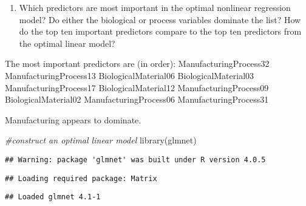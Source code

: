 \documentclass[
]{article}
\newenvironment{Shaded}{\begin{snugshade}}{\end{snugshade}}
\newcommand{\CommentTok}[1]{\textcolor[rgb]{0.56,0.35,0.01}{\textit{#1}}}
\newcommand{\FunctionTok}[1]{\textcolor[rgb]{0.00,0.00,0.00}{#1}}
\newcommand{\NormalTok}[1]{#1}
\newcommand{\OtherTok}[1]{\textcolor[rgb]{0.56,0.35,0.01}{#1}}
\newcommand{\SpecialCharTok}[1]{\textcolor[rgb]{0.00,0.00,0.00}{#1}}
\providecommand{\tightlist}{%
  \setlength{\itemsep}{0pt}\setlength{\parskip}{0pt}}
\begin{document}
\begin{enumerate}
\def\labelenumi{(\alph{enumi})}
\setcounter{enumi}{1}
\tightlist
\item
  Which predictors are most important in the optimal nonlinear
  regression model? Do either the biological or process variables
  dominate the list? How do the top ten important predictors compare to
  the top ten predictors from the optimal linear model?
\end{enumerate}

\begin{Shaded}
\end{Shaded}

The most important predictors are (in order): ManufacturingProcess32
ManufacturingProcess13 BiologicalMaterial06 BiologicalMaterial03
ManufacturingProcess17 BiologicalMaterial12 ManufacturingProcess09
BiologicalMaterial02 ManufacturingProcess06 ManufacturingProcess31

Manufacturing appears to dominate.

\begin{Shaded}
\begin{Highlighting}[]
\CommentTok{\#construct an optimal linear model}
\FunctionTok{library}\NormalTok{(glmnet)}
\end{Highlighting}
\end{Shaded}

\begin{verbatim}
## Warning: package 'glmnet' was built under R version 4.0.5
\end{verbatim}

\begin{verbatim}
## Loading required package: Matrix
\end{verbatim}

\begin{verbatim}
## Loaded glmnet 4.1-1
\end{verbatim}
\end{document}
